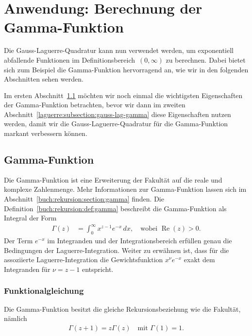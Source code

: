 %
%
%
\section{Anwendung: Berechnung der
  Gamma-Funktion%
  \label{laguerre:section:quad-gamma}}
%
Die Gauss-Laguerre-Quadratur kann nun verwendet werden,
um exponentiell abfallende Funktionen im Definitionsbereich~$(0, \infty)$
zu berechnen.
Dabei bietet sich zum Beispiel die Gamma-Funktion hervorragend an,
wie wir in den folgenden Abschnitten sehen werden.

Im ersten Abschnitt~\ref{laguerre:subsection:gamma} möchten wir noch einmal
die wichtigsten Eigenschaften der Gamma-Funktion betrachten,
bevor wir dann im zweiten Abschnitt~\ref{laguerre:subsection:gauss-lag-gamma}
diese Eigenschaften nutzen werden,
damit wir die Gauss-Laguerre-Quadratur für die Gamma-Funktion
markant verbessern können.

{\subsection{Gamma-Funktion}
\label{laguerre:subsection:gamma}}
Die Gamma-Funktion ist eine Erweiterung der Fakultät auf die reale und komplexe
Zahlenmenge.
Mehr Informationen zur Gamma-Funktion lassen sich im
Abschnitt~\ref{buch:rekursion:section:gamma} finden.
Die Definition~\ref{buch:rekursion:def:gamma} beschreibt die Gamma-Funktion als
Integral der Form
\begin{align}
\Gamma(z)
 & =
\int_0^\infty x^{z-1} e^{-x} \, dx
,
\quad
\text{wobei } \operatorname{Re}(z) > 0
\label{laguerre:gamma}
.
\end{align}
Der Term $e^{-x}$ im Integranden und der Integrationsbereich erfüllen
genau die Bedingungen der Laguerre-Integration.
Weiter zu erwähnen ist, dass für die assoziierte Laguerre-Integration die
Gewichtsfunktion $x^\nu e^{-x}$  exakt dem Integranden 
für $\nu = z - 1$ entspricht.

\subsubsection{Funktionalgleichung}
Die Gamma-Funktion besitzt die gleiche Rekursionsbeziehung wie die Fakultät,
nämlich
\begin{align}
\Gamma(z+1)
=
z \Gamma(z)
\quad
\text{mit }
\Gamma(1)
=
1
.
\label{laguerre:gamma_funktional}
\end{align}

